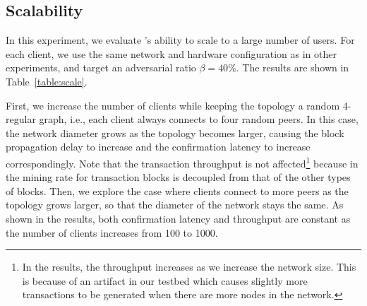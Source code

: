 
\subsection{Scalability}

\label{sec:eval-scale}
\vspace{-1mm}
\begin{table}[ht]
	\centering
	\caption{\small Performance of \prism with different network topologies.}
	\vspace{-2mm}
	\label{table:scale}
	\vspace{-2mm}
	\end{table}

In this experiment, we evaluate \prism's ability to scale to a large number of users. For each client, we use the same network and hardware configuration as in other experiments, and target an adversarial ratio $\beta=40\%$. The results are shown in Table~\ref{table:scale}.

First, we increase the number of clients while keeping the topology a random 4-regular graph, i.e., each client always connects to four random peers. In this case, the network diameter grows as the topology becomes larger, causing the block propagation delay to increase and the confirmation latency to increase correspondingly. Note that the transaction throughput is not affected\footnote{In the results, the throughput increases as we increase the network size. This is because of an artifact in our testbed which causes slightly more transactions to be generated when there are more nodes in the network.} because in \prism the mining rate for transaction blocks is decoupled from that of the other types of blocks. Then, we explore the case where clients connect to more peers as the topology grows larger, so that the diameter of the network stays the same. As shown in the results, both confirmation latency and throughput are constant as the number of clients increases from 100 to 1000. 

